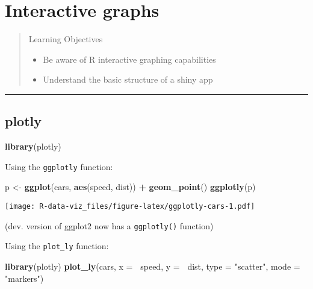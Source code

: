 \documentclass[]{book}
\newenvironment{Shaded}{\begin{snugshade}}{\end{snugshade}}
\newcommand{\KeywordTok}[1]{\textcolor[rgb]{0.13,0.29,0.53}{\textbf{#1}}}
\newcommand{\DataTypeTok}[1]{\textcolor[rgb]{0.13,0.29,0.53}{#1}}
\newcommand{\StringTok}[1]{\textcolor[rgb]{0.31,0.60,0.02}{#1}}
\newcommand{\OperatorTok}[1]{\textcolor[rgb]{0.81,0.36,0.00}{\textbf{#1}}}
\newcommand{\NormalTok}[1]{#1}
\providecommand{\tightlist}{%
  \setlength{\itemsep}{0pt}\setlength{\parskip}{0pt}}
\theoremstyle{definition}
\theoremstyle{definition}
\theoremstyle{definition}
\theoremstyle{remark}
\begin{document}
\chapter{Interactive graphs}\label{interactive-graphs}

\begin{quote}
Learning Objectives

\begin{itemize}
\tightlist
\item
  Be aware of R interactive graphing capabilities
\item
  Understand the basic structure of a shiny app
\end{itemize}
\end{quote}

\begin{center}\rule{0.5\linewidth}{\linethickness}\end{center}

\section{plotly}\label{plotly}

\begin{Shaded}
\begin{Highlighting}[]
\KeywordTok{library}\NormalTok{(plotly)}
\end{Highlighting}
\end{Shaded}

Using the \texttt{ggplotly} function:

\begin{Shaded}
\begin{Highlighting}[]
\NormalTok{p <-}\StringTok{ }\KeywordTok{ggplot}\NormalTok{(cars, }\KeywordTok{aes}\NormalTok{(speed, dist)) }\OperatorTok{+}\StringTok{ }\KeywordTok{geom_point}\NormalTok{()}
\KeywordTok{ggplotly}\NormalTok{(p)}
\end{Highlighting}
\end{Shaded}

\texttt{[image: R-data-viz\_files/figure-latex/ggplotly-cars-1.pdf]}

(dev. version of ggplot2 now has a \texttt{ggplotly()} function)

Using the \texttt{plot\_ly} function:

\begin{Shaded}
\begin{Highlighting}[]
\KeywordTok{library}\NormalTok{(plotly)}
\KeywordTok{plot_ly}\NormalTok{(cars, }\DataTypeTok{x =} \OperatorTok{~}\NormalTok{speed, }\DataTypeTok{y =} \OperatorTok{~}\NormalTok{dist, }\DataTypeTok{type =} \StringTok{"scatter"}\NormalTok{, }\DataTypeTok{mode =} \StringTok{"markers"}\NormalTok{)}
\end{Highlighting}
\end{Shaded}
\end{document}
